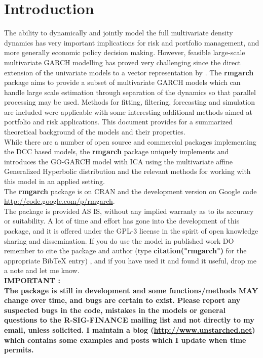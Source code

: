 \section{Introduction}
The ability to dynamically and jointly model the full multivariate density
dynamics has very important implications for risk and portfolio management,
and more generally economic policy decision making. However, feasible large-scale
multivariate GARCH modelling has proved very challenging since the direct extension
of the univariate models to a vector representation by \cite{Bollerslev1988}.
The {\bf rmgarch} package aims to provide a subset of multivariate GARCH models
which can handle large scale estimation through separation of the dynamics
so that parallel processing may be used. Methods for fitting, filtering,
forecasting and simulation are included were applicable with some interesting
additional methods aimed at portfolio and risk applications. This document provides
for a summarized theoretical background of the models and their properties.\\
While there are a number of open source and commercial packages implementing the
DCC based models, the {\bf rmgarch} package uniquely implements and introduces
the GO-GARCH model with ICA using the multivariate affine Generalized Hyperbolic
distribution and the relevant methods for working with this model in an applied setting.\\
The {\bf rmgarch} package is on CRAN and the development version on Google 
code \url{http://code.google.com/p/rmgarch}.\\
The package is provided AS IS, without any implied warranty as to its accuracy
or suitability. A lot of time and effort has gone into the development of this
package, and it is offered under the GPL-3 license in the spirit of open knowledge
sharing and dissemination. If you do use the model in published work DO remember
to cite the package and author (type {\bf citation("rmgarch")} for the
appropriate BibTeX entry) , and if you have used it and found it useful, drop me
a note and let me know.\\
\textbf{ IMPORTANT :\\
The package is still in development and some functions/methods MAY change over time, 
and bugs are certain to exist. Please report any suspected bugs in the code, mistakes 
in the models or general questions to the R-SIG-FINANCE mailing list and not directly 
to my email, unless solicited. I maintain a blog (\url{http://www.unstarched.net}) 
which contains some examples and posts which I update when time permits.}
